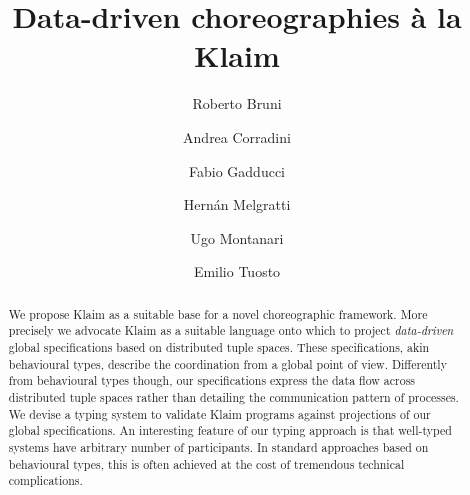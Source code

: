 \documentclass[runningheads,a4paper]{llncs}
\begin{document}
\mainmatter  %

\title{
  \iffinal
  Data-driven choreographies \`a la Klaim
  \else
  \fi
}


%
%

\author{
  Roberto Bruni  \and
  Andrea Corradini  \and
  Fabio Gadducci  \and
  Hern\'an Melgratti  \and
  Ugo Montanari  \and
  Emilio Tuosto
}

\iffinal
\else
{}
\fi

\maketitle

\begin{abstract}
  We propose Klaim as a suitable base for a novel choreographic
  framework.
  More precisely we advocate Klaim as a suitable language onto which
  to project \emph{data-driven} global specifications based on
  distributed tuple spaces.
  These specifications, akin behavioural types, describe the coordination
  from a global point of view.
  Differently from behavioural types though, our specifications
  express the data flow across distributed tuple spaces rather than
  detailing the communication pattern of processes.
  We devise a typing system to validate Klaim programs against projections
  of our global specifications.
  An interesting feature of our typing approach is that well-typed
  systems have arbitrary number of participants.
  In standard approaches based on behavioural types, this is often
  achieved at the cost of tremendous technical complications.
\end{abstract}
\end{document}

